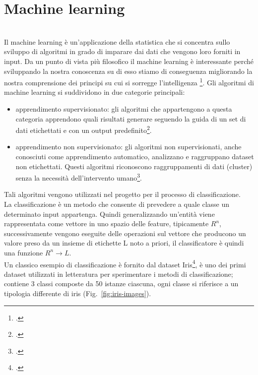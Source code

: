 \chapter{Machine learning}
\label{cap:teoria}
 \\
Il machine learning è un'applicazione della statistica che si concentra sullo sviluppo di algoritmi in grado di imparare dai dati che vengono loro forniti in input.
Da un punto di vista più filosofico il machine learning è interessante perché sviluppando la nostra conoscenza su di esso stiamo di conseguenza migliorando la nostra comprensione dei principi su cui si sorregge l'intelligenza \footcite[p.~97]{Goodfellow-et-al-2016}.
Gli algoritmi di machine learning si suddividono in due categorie principali:

\begin{itemize}
    \item apprendimento supervisionato: gli algoritmi che appartengono a questa categoria apprendono quali risultati generare seguendo la guida di un set di dati etichettati e con un output predefinito\footcite{site:machine-learning}.

    \item apprendimento non supervisionato: gli algoritmi non supervisionati, anche conosciuti come apprendimento automatico, analizzano e raggruppano dataset non etichettati. Questi algoritmi riconoscono raggruppamenti di dati (cluster) senza la necessità dell'intervento umano\footcite{site:machine-learning}.
\end{itemize}

Tali algoritmi vengono utilizzati nel progetto per il processo di classificazione. \\
La classificazione è un metodo che consente di prevedere a quale classe un determinato input appartenga. 
Quindi generalizzando un'entità viene rappresentata come vettore in uno spazio delle feature, tipicamente \( R^n \), successivamente vengono eseguite delle operazioni sul vettore che producono un valore preso da un insieme di etichette L noto a priori, il classificatore è quindi una funzione \( R^n \rightarrow L \). \\
Un classico esempio di classificazione è fornito dal dataset Iris\footcite{site:iris-dataset}, è uno dei primi dataset utilizzati in letteratura per sperimentare i metodi di classificazione; contiene 3 classi composte da 50 istanze ciascuna, ogni classe si riferisce a un tipologia differente di iris (Fig.~\ref{fig:iris-images}).

